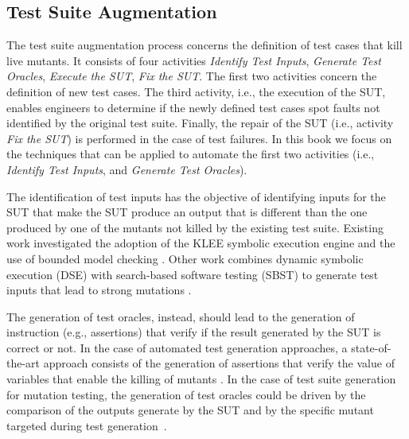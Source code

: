 
\subsection{Test Suite Augmentation} %
\label{sub:test_suite_augmentation}

The test suite augmentation process concerns the definition of test cases that kill live mutants.
It consists of four activities \emph{Identify Test Inputs}, \emph{Generate Test Oracles}, \emph{Execute the SUT}, \emph{Fix the SUT}. The first two activities concern the definition of new test cases.
The third activity, i.e., the execution of the SUT, enables engineers to determine if the newly defined test cases spot faults not identified by the original test suite. 
Finally, the repair of the SUT (i.e., activity \emph{Fix the SUT}) is performed in the case of test failures.
In this book we focus on the techniques that can be applied to automate the first two activities (i.e., \emph{Identify Test Inputs}, and \emph{Generate Test Oracles}).
 
The identification of test inputs has the objective of identifying inputs for the SUT that make the SUT produce an output that is different than the one produced by one of the mutants not killed by the existing test suite.
Existing work investigated the adoption of the KLEE symbolic execution engine \cite{holling2016nequivack} and the use of bounded model checking \cite{riener2011test}. Other work combines dynamic symbolic execution (DSE) with search-based software testing (SBST) to generate test inputs that lead to strong mutations \cite{harman2011strong}. 

The generation of test oracles, instead, should lead to the generation of instruction (e.g., assertions) that verify if the result generated by the SUT is correct or not.
In the case of automated test generation approaches, a state-of-the-art approach consists of the generation of assertions that verify the value of variables that enable the killing of mutants \cite{fraser2011mutation}. 
In the case of test suite generation for mutation testing, the generation of test oracles could be driven by the comparison of the outputs generate by the SUT and by the specific mutant targeted during test generation~\cite{Staats2012}.

